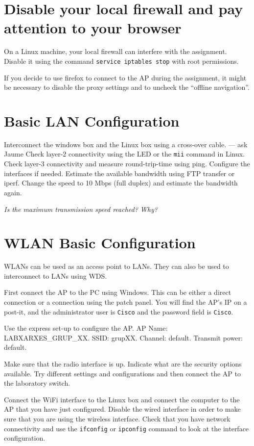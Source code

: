 \section{Disable your local firewall and pay attention to your browser}

On a Linux machine, your local firewall can interfere with the assignment.
Disable it using the command \texttt{service iptables stop} with root permissions.

If you decide to use firefox to connect to the AP during the assignment, it might be necessary to disable the proxy settings and to uncheck the ``offline navigation''.

\section{Basic LAN Configuration}

Interconnect the windows box and the Linux box using a cross-over cable. --- ask Jaume
Check layer-2 connectivity using the LED or the \texttt{mii} command in Linux.
Check layer-3 connectivity and measure round-trip-time using ping.
Configure the interfaces if needed.
Estimate the available bandwidth using FTP transfer or iperf.
Change the speed to 10 Mbps (full duplex) and estimate the bandwidth again.

\emph{Is the maximum transmission speed reached? Why?}

\section{WLAN Basic Configuration}

WLANs can be used as an access point to LANs.
They can also be used to interconnect to LANs using WDS.

First connect the AP to the PC using Windows.
This can be either a direct connection or a connection using the patch panel.
You will find the AP's IP on a post-it, and the administrator user is \texttt{Cisco} and the password field is \texttt{Cisco}.

Use the express set-up to configure the AP.
AP Name: LABXARXES\_GRUP\_XX.
SSID: grupXX.
Channel: default.
Transmit power: default.

Make sure that the radio interface is up.
Indicate what are the security options available.
Try different settings and configurations and then connect the AP to the laboratory switch.

Connect the WiFi interface to the Linux box and connect the computer to the AP that you have just configured.
Disable the wired interface in order to make sure that you are using the wireless interface.
Check that you have network connectivity and use the \texttt{ifconfig} or \texttt{ipconfig} command to look at the interface configuration.

